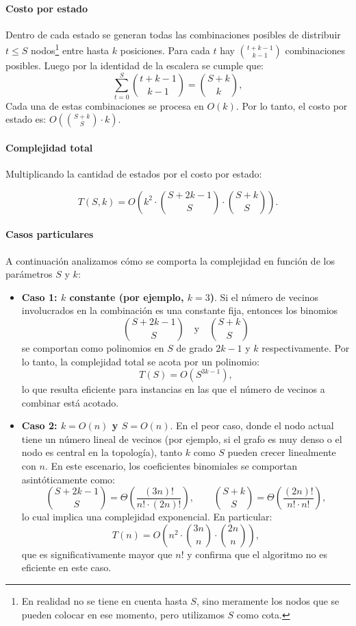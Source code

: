 \paragraph{Costo por estado} Dentro de cada estado se generan todas las combinaciones posibles de distribuir $t \leq S$ nodos\footnote{En realidad no se tiene en cuenta hasta $S$, sino meramente los nodos que se pueden colocar en ese momento, pero utilizamos $S$ como cota. } entre hasta $k$ posiciones. Para cada $t$ hay $\binom{t + k - 1}{k - 1}$ combinaciones posibles. Luego por la identidad de la escalera se cumple que:
    \[
    \sum_{t=0}^{S} \binom{t + k - 1}{k - 1} = \binom{S + k}{k},
    \]
     Cada una de estas combinaciones se procesa en $O(k)$. Por lo tanto, el costo por estado es: $O\left(\binom{S + k}{S} \cdot k\right).$



\paragraph{Complejidad total}

Multiplicando la cantidad de estados por el costo por estado:

\[
T(S, k) = O\left(
    k^2\cdot
    \binom{S + 2k - 1}{S} \cdot
    \binom{S + k}{S}
\right).
\]

\paragraph{Casos particulares}

A continuación analizamos cómo se comporta la complejidad en función de los parámetros $S$ y $k$:

\begin{itemize}
    \item \textbf{Caso 1: $k$ constante (por ejemplo, $k = 3$)}.  
    Si el número de vecinos involucrados en la combinación es una constante fija, entonces los binomios
    \[
    \binom{S + 2k - 1}{S} \quad \text{y} \quad \binom{S + k}{S}
    \]
    se comportan como polinomios en $S$ de grado $2k - 1$ y $k$ respectivamente. Por lo tanto, la complejidad total se acota por un polinomio:
    \[
    T(S) = O\left(S^{3k - 1}\right),
    \]
    lo que resulta eficiente para instancias en las que el número de vecinos a combinar está acotado.

    \item \textbf{Caso 2: $k = O(n)$ y $S = O(n)$}.  
    En el peor caso, donde el nodo actual tiene un número lineal de vecinos (por ejemplo, si el grafo es muy denso o el nodo es central en la topología), tanto $k$ como $S$ pueden crecer linealmente con $n$. En este escenario, los coeficientes binomiales se comportan asintóticamente como:
    \[
    \binom{S + 2k - 1}{S} = \Theta\left( \frac{(3n)!}{n! \cdot (2n)!} \right),
    \qquad
    \binom{S + k}{S} = \Theta\left( \frac{(2n)!}{n! \cdot n!} \right),
    \]
    lo cual implica una complejidad exponencial. En particular:
    \[
    T(n) = O\left( n^2 \cdot \binom{3n}{n} \cdot \binom{2n}{n} \right),
    \]
    que es significativamente mayor que $n!$ y confirma que el algoritmo no es eficiente en este caso. 
\end{itemize}

